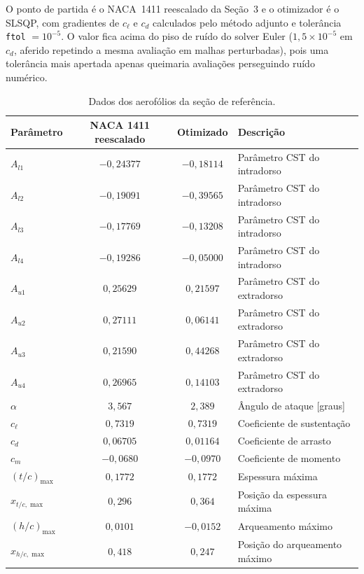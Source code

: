 O ponto de partida é o NACA~1411 reescalado da Seção~3 e o otimizador é o
SLSQP, com gradientes de $c_\ell$ e $c_d$ calculados pelo método adjunto e
tolerância \texttt{ftol} $= 10^{-5}$. O valor fica acima do piso de
ruído do solver Euler ($1{,}5\times10^{-5}$ em $c_d$, aferido repetindo a
mesma avaliação em malhas perturbadas), pois uma tolerância mais apertada
apenas queimaria avaliações perseguindo ruído numérico.

\begin{table}[H]
\centering
\caption{Dados dos aerofólios da seção de referência.}\label{tab:airfoils_opt}
\renewcommand{\arraystretch}{1.2}
\begin{tabular}{lccl}
\toprule
Parâmetro & NACA 1411 reescalado & Otimizado & Descrição \\
\midrule
$A_{l1}$        & $-0{,}24377$ & $-0{,}18114$ & Parâmetro CST do intradorso \\
$A_{l2}$        & $-0{,}19091$ & $-0{,}39565$ & Parâmetro CST do intradorso \\
$A_{l3}$        & $-0{,}17769$ & $-0{,}13208$ & Parâmetro CST do intradorso \\
$A_{l4}$        & $-0{,}19286$ & $-0{,}05000$ & Parâmetro CST do intradorso \\
$A_{u1}$        & $0{,}25629$  & $0{,}21597$  & Parâmetro CST do extradorso \\
$A_{u2}$        & $0{,}27111$  & $0{,}06141$  & Parâmetro CST do extradorso \\
$A_{u3}$        & $0{,}21590$  & $0{,}44268$  & Parâmetro CST do extradorso \\
$A_{u4}$        & $0{,}26965$  & $0{,}14103$  & Parâmetro CST do extradorso \\
$\alpha$        & $3{,}567$    & $2{,}389$    & Ângulo de ataque [graus] \\
$c_\ell$        & $0{,}7319$   & $0{,}7319$   & Coeficiente de sustentação \\
$c_d$           & $0{,}06705$  & $0{,}01164$  & Coeficiente de arrasto \\
$c_m$           & $-0{,}0680$  & $-0{,}0970$  & Coeficiente de momento \\
$(t/c)_{\max}$  & $0{,}1772$   & $0{,}1772$   & Espessura máxima \\
$x_{t/c,\max}$  & $0{,}296$    & $0{,}364$    & Posição da espessura máxima \\
$(h/c)_{\max}$  & $0{,}0101$   & $-0{,}0152$  & Arqueamento máximo \\
$x_{h/c,\max}$  & $0{,}418$    & $0{,}247$    & Posição do arqueamento máximo \\
\bottomrule
\end{tabular}
\end{table}

